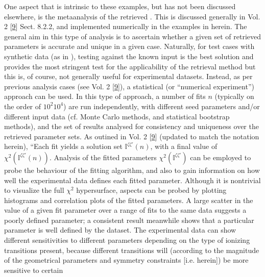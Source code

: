 \documentclass[letterpaper,table,10pt,english]{jupyterBook}
\begin{document}
\sphinxAtStartPar
One aspect that is intrinsic to these examples, but has not been discussed elsewhere, is the meta\sphinxhyphen{}analysis of the retrieved {\hyperref[\detokenize{backmatter/glossary:term-radial-matrix-elements}]{}}. This is discussed generally in  Vol. 2 {[}\hyperlink{cite.backmatter/bibliography:id676}{9}{]} Sect. 8.2.2, and implemented numerically in the examples in {\hyperref[\detokenize{part2/extracting_matrix_elements_overview_270423:chpt-extracting-matrix-elements-overview}]{}} herein. The general aim in this type of analysis is to ascertain whether a given set of retrieved parameters is accurate and unique in a given case. Naturally, for test cases with synthetic data (as in {\hyperref[\detokenize{part2/extracting_matrix_elements_overview_270423:chpt-extracting-matrix-elements-overview}]{}}), testing against the known input {\hyperref[\detokenize{backmatter/glossary:term-radial-matrix-elements}]{}} is the best solution and provides the most stringent test for the applicability of the retrieval method \sphinxhyphen{} but this is, of course, not generally useful for experimental datasets. Instead, as per previous analysis cases (see  Vol. 2 {[}\hyperlink{cite.backmatter/bibliography:id676}{9}{]}), a statistical (or “numerical experiment”) approach can be used. In this type of approach, a number of fits \(n\) (typically on the order of \(10^2\)\sphinxhyphen{}\(10^4\)) are run independently, with different seed parameters and/or different input data (cf. Monte Carlo methods, and statistical bootstrap methods), and the set of results analysed for consistency and uniqueness over the retrieved parameter sets. As outined in  Vol. 2 {[}\hyperlink{cite.backmatter/bibliography:id676}{9}{]} (updated to match the notation herein), “Each fit yields a solution set \(\mathbb{I}^{\zeta\zeta'}(n)\), with a final value of \(\chi^{2}(\mathbb{I}^{\zeta\zeta'}(n))\). Analysis of the fitted parameters \(\chi^{2}(\mathbb{I}^{\zeta\zeta'})\) can be employed to probe the behaviour of the fitting algorithm, and also to gain information on how well the experimental data defines each fitted parameter. Although it is non\sphinxhyphen{}trivial to visualize the full \(\chi^{2}\) hypersurface, aspects can be probed by plotting histograms and correlation plots of the fitted parameters. A large scatter in the value of a given fit parameter over a range of fits to the same data suggests a poorly defined parameter; a consistent result meanwhile shows that a particular parameter is well defined by the dataset. The experimental data can show different sensitivities to different parameters depending on the type of ionizing transitions present, because different transitions will (according to the magnitude of the geometrical parameters and symmetry constraints {[}i.e. {\hyperref[\detokenize{backmatter/glossary:term-channel-functions}]{}} herein{]}) be more sensitive to certain 
\end{document}
